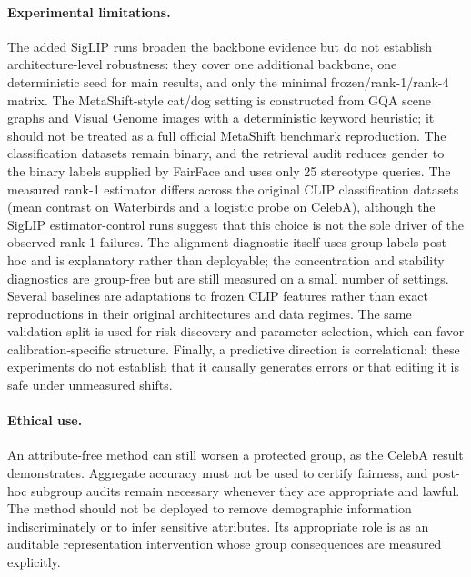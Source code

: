 \paragraph{Experimental limitations.}
The added SigLIP runs broaden the backbone evidence but do not establish architecture-level robustness: they cover one additional backbone, one deterministic seed for main results, and only the minimal frozen/rank-1/rank-4 matrix. The MetaShift-style cat/dog setting is constructed from GQA scene graphs and Visual Genome images with a deterministic keyword heuristic; it should not be treated as a full official MetaShift benchmark reproduction. The classification datasets remain binary, and the retrieval audit reduces gender to the binary labels supplied by FairFace and uses only 25 stereotype queries. The measured rank-1 estimator differs across the original CLIP classification datasets (mean contrast on Waterbirds and a logistic probe on CelebA), although the SigLIP estimator-control runs suggest that this choice is not the sole driver of the observed rank-1 failures. The alignment diagnostic itself uses group labels post hoc and is explanatory rather than deployable; the concentration and stability diagnostics are group-free but are still measured on a small number of settings. Several baselines are adaptations to frozen CLIP features rather than exact reproductions in their original architectures and data regimes. The same validation split is used for risk discovery and parameter selection, which can favor calibration-specific structure. Finally, a predictive direction is correlational: these experiments do not establish that it causally generates errors or that editing it is safe under unmeasured shifts.

\paragraph{Ethical use.}
An attribute-free method can still worsen a protected group, as the CelebA result demonstrates. Aggregate accuracy must not be used to certify fairness, and post-hoc subgroup audits remain necessary whenever they are appropriate and lawful. The method should not be deployed to remove demographic information indiscriminately or to infer sensitive attributes. Its appropriate role is as an auditable representation intervention whose group consequences are measured explicitly.
